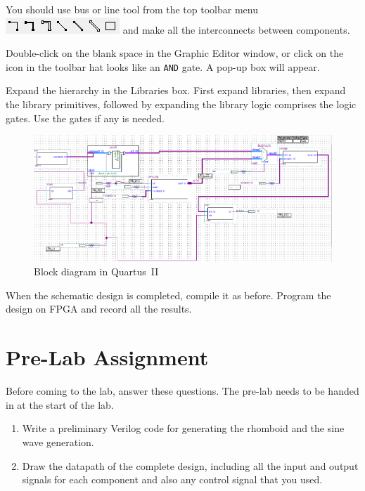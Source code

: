 \documentclass[12pt, logo=tehranDLDL/ut]{tehranDLDL}
\begin{document}
You should use bus or line tool from the top toolbar menu \includegraphics[height=2ex]{QuartusII4} and make all the interconnects between components.

Double-click on the blank space in the Graphic Editor window, or click on the icon in the toolbar hat looks like an \texttt{AND} gate. A pop-up box will appear.

Expand the hierarchy in the Libraries box. First expand libraries, then expand the library primitives, followed by expanding the library logic comprises the logic gates. Use the gates if any is needed.

\begin{figure}
    \centering
    \caption{Block diagram in Quartus~II\label{fig:qblockdia}}
    \includegraphics[width=\textwidth]{QuartusII5}
\end{figure}

When the schematic design is completed, compile it as before. Program the design on FPGA and record all the results.

\designverification{}

\section*{Pre-Lab Assignment}
Before coming to the lab, answer these questions. The pre-lab needs to be handed in at the start of the lab.

\begin{enumerate}
    \item Write a preliminary Verilog code for generating the rhomboid and the sine wave generation.
    \item Draw the datapath of the complete design, including all the input and output signals for each component and also any control signal that you used.
\end{enumerate}
\end{document}
